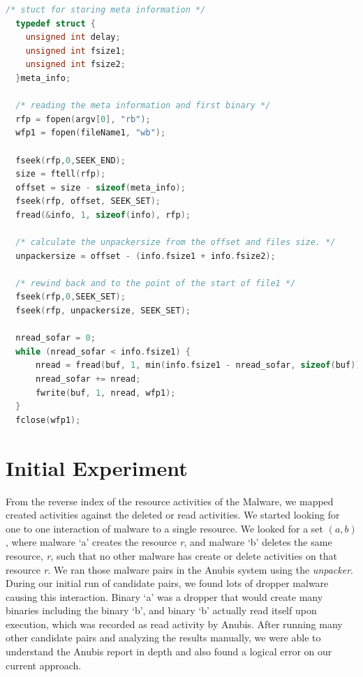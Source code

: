\begin{lstlisting}[language=c,caption={snippet of unpacker.c file}, label={lst:unpacker.c}]
  /* stuct for storing meta information */
  typedef struct {
    unsigned int delay;
    unsigned int fsize1;
    unsigned int fsize2;
  }meta_info;

  /* reading the meta information and first binary */
  rfp = fopen(argv[0], "rb");
  wfp1 = fopen(fileName1, "wb");

  fseek(rfp,0,SEEK_END);
  size = ftell(rfp);
  offset = size - sizeof(meta_info);
  fseek(rfp, offset, SEEK_SET);
  fread(&info, 1, sizeof(info), rfp);

  /* calculate the unpackersize from the offset and files size. */
  unpackersize = offset - (info.fsize1 + info.fsize2);

  /* rewind back and to the point of the start of file1 */
  fseek(rfp,0,SEEK_SET);
  fseek(rfp, unpackersize, SEEK_SET);

  nread_sofar = 0;
  while (nread_sofar < info.fsize1) {
      nread = fread(buf, 1, min(info.fsize1 - nread_sofar, sizeof(buf)), rfp);
      nread_sofar += nread;
      fwrite(buf, 1, nread, wfp1);
  }
  fclose(wfp1);
 \end{lstlisting}
\section{Initial Experiment}
\label{sec:Initial Experiment}
From the reverse index of the resource activities of the Malware, we mapped created activities against the deleted or read activities.
We started looking for one to one interaction of malware to a single resource.
We looked for a set $(a, b)$, where malware `a' creates the resource \emph{r}, and malware `b' deletes the same resource, \emph{r}, such that no other malware has create or delete activities on that resource \emph{r}. We ran those malware pairs in the Anubis system using the \emph{unpacker}.
During our initial run of candidate pairs, we found lots of dropper malware causing this interaction. Binary `a' was a dropper that would create many binaries including the binary `b', and binary `b' actually read itself upon execution, which was recorded as read activity by Anubis.
After running many other candidate pairs and analyzing the results manually, we were able to understand the Anubis report in depth and also found a logical error on our current approach.\\

